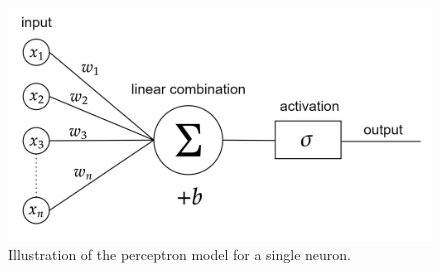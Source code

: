 \begin{figure}[H]
    \begin{center}
        \includegraphics[scale=0.3]{img/diagram-20220205_1.png}
    \end{center}
    \caption{Illustration of the perceptron model for a single neuron.}
    \label{fig4}
\end{figure}

